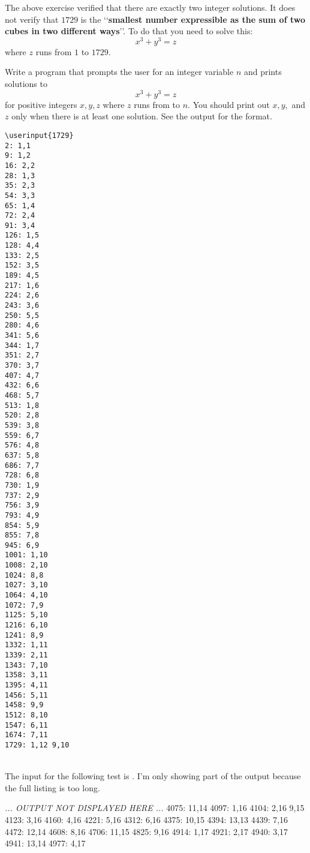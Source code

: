 The above exercise verified that there are exactly two integer solutions. It
does not verify that $1729$ is the \lq\lq\textbf{smallest number expressible as
the sum of two cubes in two different ways}\rq\rq. To do that you need to solve
this:
\[x^3 + y^3 = z\]
where $z$ runs from $1$ to $1729$.

Write a program that prompts the user for an integer variable $n$ and prints
solutions to
\[x^3 + y^3 = z\]
for positive integers $x, y, z$ where $z$ runs from  to $n$.
You should
print out $x, y,$ and $z$ only when there is at least one solution. See the
output for the format.

\resett
\nextt
\begin{Verbatim}[frame=single, commandchars=\\\{\}]
\userinput{1729}
2: 1,1
9: 1,2
16: 2,2
28: 1,3
35: 2,3
54: 3,3
65: 1,4
72: 2,4
91: 3,4
126: 1,5
128: 4,4
133: 2,5
152: 3,5
189: 4,5
217: 1,6
224: 2,6
243: 3,6
250: 5,5
280: 4,6
341: 5,6
344: 1,7
351: 2,7
370: 3,7
407: 4,7
432: 6,6
468: 5,7
513: 1,8
520: 2,8
539: 3,8
559: 6,7
576: 4,8
637: 5,8
686: 7,7
728: 6,8
730: 1,9
737: 2,9
756: 3,9
793: 4,9
854: 5,9
855: 7,8
945: 6,9
1001: 1,10
1008: 2,10
1024: 8,8
1027: 3,10
1064: 4,10
1072: 7,9
1125: 5,10
1216: 6,10
1241: 8,9
1332: 1,11
1339: 2,11
1343: 7,10
1358: 3,11
1395: 4,11
1456: 5,11
1458: 9,9
1512: 8,10
1547: 6,11
1674: 7,11
1729: 1,12 9,10
\end{Verbatim}

\nextt
\\
The input for the following test is .
I'm only showing part of the output because the full listing is too long.
\begin{console}[commandchars=\\\{\}]
\textit{... OUTPUT NOT DISPLAYED HERE ...}
4075: 11,14
4097: 1,16
4104: 2,16 9,15
4123: 3,16 
4160: 4,16 
4221: 5,16 
4312: 6,16 
4375: 10,15 
4394: 13,13 
4439: 7,16 
4472: 12,14 
4608: 8,16 
4706: 11,15 
4825: 9,16 
4914: 1,17 
4921: 2,17 
4940: 3,17 
4941: 13,14 
4977: 4,17 
\end{console}
